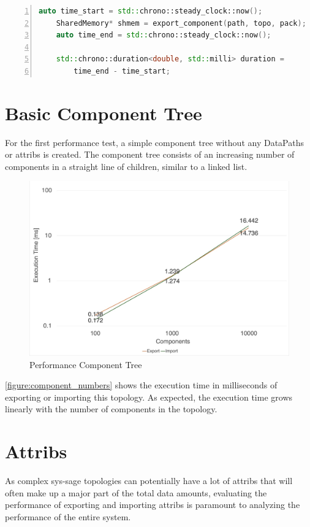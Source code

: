 \begin{lstlisting}[language=c++, numbers=left, caption= Measuring the Execution Time, captionpos=b, label={lst:performance_code}]
    auto time_start = std::chrono::steady_clock::now();
    SharedMemory* shmem = export_component(path, topo, pack);
    auto time_end = std::chrono::steady_clock::now();

    std::chrono::duration<double, std::milli> duration =
        time_end - time_start;
\end{lstlisting}

\section{Basic Component Tree}
For the first performance test, a simple component tree without any DataPaths or attribs is created. The component tree consists of an increasing number of components in a straight line of children, similar to a linked list.

\begin{figure}[ht]
    \includegraphics[scale=0.25]{images/component_numbers.jpeg}
    \centering
    \caption{Performance Component Tree}
    \label{figure:component_numbers}
\end{figure}

\autoref{figure:component_numbers} shows the execution time in milliseconds of exporting or importing this topology. As expected, the execution time grows linearly with the number of components in the topology.

\section{Attribs}
As complex sys-sage topologies can potentially have a lot of attribs that will often make up a major part of the total data amounts, evaluating the performance of exporting and importing
attribs is paramount to analyzing the performance of the entire system.

